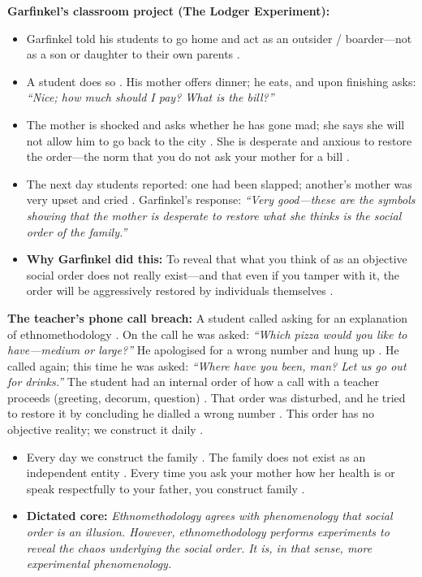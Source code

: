 \begin{ExampleBox}
\textbf{Garfinkel's classroom project (The Lodger Experiment):}
\begin{itemize}
    \item Garfinkel told his students to go home and act as an outsider / boarder---not as a son or daughter to their own parents .
    \item A student does so . His mother offers dinner; he eats, and upon finishing asks: \textit{``Nice; how much should I pay? What is the bill?''} 
    \item The mother is shocked and asks whether he has gone mad; she says she will not allow him to go back to the city . She is desperate and anxious to restore the order---the norm that you do not ask your mother for a bill .
    \item The next day students reported: one had been slapped; another's mother was very upset and cried . Garfinkel's response: \textit{``Very good---these are the symbols showing that the mother is desperate to restore what she thinks is the social order of the family.''} 
    \item \textbf{Why Garfinkel did this:} To reveal that what you think of as an objective social order does not really exist---and that even if you tamper with it, the order will be aggressively restored by individuals themselves .
\end{itemize}
\end{ExampleBox}

\begin{ExampleBox}
\textbf{The teacher's phone call breach:} A student called asking for an explanation of ethnomethodology . On the call he was asked: \textit{``Which pizza would you like to have---medium or large?''}  He apologised for a wrong number and hung up . He called again; this time he was asked: \textit{``Where have you been, man? Let us go out for drinks.''}  The student had an internal order of how a call with a teacher proceeds (greeting, decorum, question) . That order was disturbed, and he tried to restore it by concluding he dialled a wrong number . This order has no objective reality; we construct it daily .
\end{ExampleBox}

\begin{KeyConcept}
\begin{itemize}
    \item Every day we construct the family . The family does not exist as an independent entity . Every time you ask your mother how her health is or speak respectfully to your father, you construct family .
    \item \textbf{Dictated core:} \textit{Ethnomethodology agrees with phenomenology that social order is an illusion. However, ethnomethodology performs experiments to reveal the chaos underlying the social order. It is, in that sense, more experimental phenomenology.} 
\end{itemize}
\end{KeyConcept}

